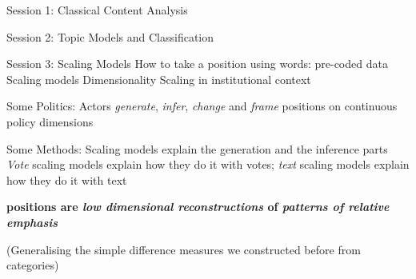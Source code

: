 \documentclass[kp]{foilpack}
\author{\textbf{Will Lowe}\\University of Mannheim \and
 \textbf{Sven-Oliver Proksch}\\McGill University}
\date{}
\begin{document}
\maketitle


Session 1: Classical Content Analysis

Session 2: Topic Models and Classification

Session 3: 
\ita
\itm Scaling Models
\ita
\itm How to take a position using words: pre-coded data
\itm Scaling models
\itm Dimensionality
\itm Scaling in institutional context
\itz
\itz


Some Politics:
\ita
\itm Actors \textit{generate}, \textit{infer}, \textit{change} and \textit{frame} positions on continuous policy dimensions
\itz

Some Methods:
\ita
\itm Scaling models explain the generation and the inference parts
\itm \textit{Vote} scaling models explain how they do it with votes; \textit{text} scaling models explain how they do it with text
\itz


\textbf{positions are \textit{low dimensional reconstructions} of \textit{patterns of relative emphasis}}

(Generalising the simple difference measures we constructed before from categories)

%	
% 
%
%
%
%
%
%   
%  
%
%
% 
%
%
\end{document}
